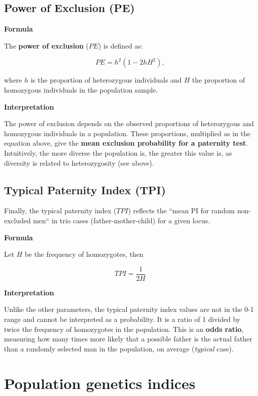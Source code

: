 \documentclass[
]{book}
\begin{document}
\hypertarget{power-of-exclusion-pe}{%
\section{Power of Exclusion (PE)}\label{power-of-exclusion-pe}}

\textbf{Formula}

The \textbf{power of exclusion} (\(PE\)) is defined as:

\[
PE = h^2\left(1 - 2hH^2\right),
\]

where \(h\) is the proportion of heterozygous individuals and \(H\) the
proportion of homozygous individuals in the population sample.

\textbf{Interpretation}

The power of exclusion depends on the observed proportions of heterozygous and homozygous individuals in a population. These proportions, multiplied as in the equation above, give the \textbf{mean exclusion probability for a paternity test}. Intuitively, the more diverse the population is, the greater this value is, as diversity is related to heterozygosity (see above).

\hypertarget{typical-paternity-index-tpi}{%
\section{Typical Paternity Index (TPI)}\label{typical-paternity-index-tpi}}

Finally, the typical paternity index (\(TPI\)) reflects the ``mean PI for
random non-excluded men`` in trio cases (father-mother-child) for a given locus.

\textbf{Formula}

Let \(H\) be the frequency of homozygotes, then

\[
TPI = \frac{1}{2H}
\]

\textbf{Interpretation}

Unlike the other parameters, the typical paternity index values are not in the 0-1
range and cannot be interpreted as a probability. It is a ratio of 1 divided by
twice the frequency of homozygotes in the population. This is an \textbf{odds ratio},
measuring how many times more likely that a possible father is the actual
father than a randomly selected man in the population, on average (\emph{typical} case).

\hypertarget{popgen-indices}{%
\chapter{Population genetics indices}\label{popgen-indices}}
\end{document}

